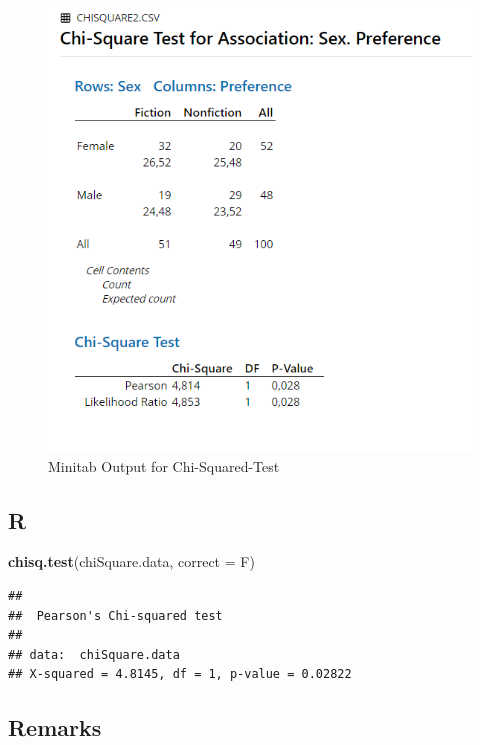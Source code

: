 \documentclass[
]{book}
\newenvironment{Shaded}{\begin{snugshade}}{\end{snugshade}}
\newcommand{\DataTypeTok}[1]{\textcolor[rgb]{0.13,0.29,0.53}{#1}}
\newcommand{\KeywordTok}[1]{\textcolor[rgb]{0.13,0.29,0.53}{\textbf{#1}}}
\newcommand{\NormalTok}[1]{#1}
\begin{document}
\begin{figure}[!h]
\includegraphics{Screenshots/Chi Squared/ChiSquaredMinitab} \caption{\label{fig:cstMinitab}Minitab Output for Chi-Squared-Test}\label{fig:cstMinitab}
\end{figure}

\hypertarget{r-2}{%
\subsection{R}\label{r-2}}

\begin{Shaded}
\begin{Highlighting}[]
\KeywordTok{chisq.test}\NormalTok{(chiSquare.data, }\DataTypeTok{correct =}\NormalTok{ F)}
\end{Highlighting}
\end{Shaded}

\begin{verbatim}
## 
## 	Pearson's Chi-squared test
## 
## data:  chiSquare.data
## X-squared = 4.8145, df = 1, p-value = 0.02822
\end{verbatim}

\hypertarget{remarks-2}{%
\subsection{Remarks}\label{remarks-2}}
\end{document}
